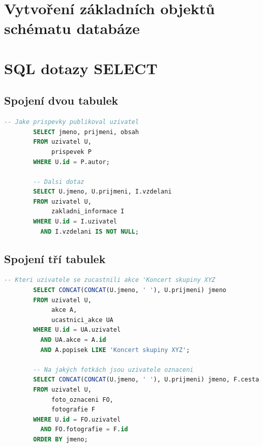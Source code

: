 \documentclass[11pt,a4paper]{article}
\begin{document}
\section{Vytvoření základních objektů schématu databáze}

\section{SQL dotazy SELECT}

\subsection{Spojení dvou tabulek}
\begin{minipage}{\linewidth}
    \begin{center}
        \begin{lstlisting}[language=sql]
        -- Jake prispevky publikoval uzivatel
        SELECT jmeno, prijmeni, obsah
        FROM uzivatel U,
             prispevek P
        WHERE U.id = P.autor;
        
        -- Dalsi dotaz
        SELECT U.jmeno, U.prijmeni, I.vzdelani
        FROM uzivatel U,
             zakladni_informace I
        WHERE U.id = I.uzivatel
          AND I.vzdelani IS NOT NULL;\end{lstlisting}
    \end{center}
\end{minipage}

\subsection{Spojení tří tabulek}
\begin{minipage}{\linewidth}
    \begin{center}
        \begin{lstlisting}[language=sql]
        -- Kteri uzivatele se zucastnili akce 'Koncert skupiny XYZ
        SELECT CONCAT(CONCAT(U.jmeno, ' '), U.prijmeni) jmeno
        FROM uzivatel U,
             akce A,
             ucastnici_akce UA
        WHERE U.id = UA.uzivatel
          AND UA.akce = A.id
          AND A.popisek LIKE 'Koncert skupiny XYZ';
          
        -- Na jakých fotkách jsou uzivatele oznaceni
        SELECT CONCAT(CONCAT(U.jmeno, ' '), U.prijmeni) jmeno, F.cesta foto
        FROM uzivatel U,
             foto_oznaceni FO,
             fotografie F
        WHERE U.id = FO.uzivatel
          AND FO.fotografie = F.id
        ORDER BY jmeno;\end{lstlisting}
    \end{center}
\end{minipage}
\end{document}
